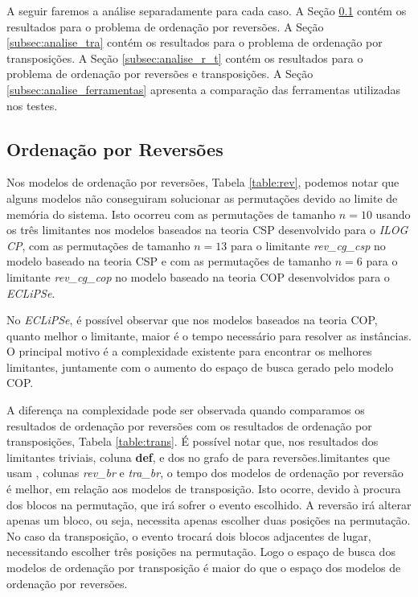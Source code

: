 A seguir faremos a análise separadamente para cada caso. A
Seção \ref{subsec:analise_rev} contém os resultados para o problema de
ordenação por reversões. A Seção \ref{subsec:analise_tra} contém os
resultados para o problema de ordenação por transposições. A
Seção \ref{subsec:analise_r_t} contém os resultados para o problema de
ordenação por reversões e transposições. A
Seção \ref{subsec:analise_ferramentas} apresenta a comparação das
ferramentas utilizadas nos testes.

\subsection{Ordenação por Reversões}
\label{subsec:analise_rev}
Nos modelos de ordenação por reversões, Tabela \ref{table:rev},
podemos notar que alguns modelos não conseguiram solucionar as
permutações devido ao limite de memória do sistema. Isto ocorreu com
as permutações de tamanho $n = 10$ usando os três limitantes nos
modelos baseados na teoria CSP desenvolvido para o \textit{ILOG CP},
com as permutações de tamanho $n = 13$ para o
limitante \textit{rev\_cg\_csp} no modelo baseado na teoria CSP e com
as permutações de tamanho $n = 6$ para o
limitante \textit{rev\_cg\_cop} no modelo baseado na teoria COP
desenvolvidos para o \textit{ECLiPSe}.

No \textit{ECLiPSe}, é possível observar que nos modelos baseados na
teoria COP, quanto melhor o limitante, maior é o tempo necessário para
resolver as instâncias. O principal motivo é a complexidade existente
para encontrar os melhores limitantes, juntamente com o aumento do
espaço de busca gerado pelo modelo COP. 

A diferença na complexidade pode ser observada quando comparamos os
resultados de ordenação por reversões com os resultados de ordenação
por transposições, Tabela \ref{table:trans}. É possível notar que, nos
resultados dos limitantes triviais, coluna \textbf{def}, e dos no
grafo de \bkp{} para reversões.limitantes que usam \bkp{},
colunas \textit{rev\_br} e \textit{tra\_br}, o tempo dos modelos de
ordenação por reversão é melhor, em relação aos modelos de
transposição. Isto ocorre, devido à procura dos blocos na permutação,
que irá sofrer o evento escolhido. A reversão irá alterar apenas um
bloco, ou seja, necessita apenas escolher duas posições na
permutação. No caso da transposição, o evento trocará dois blocos
adjacentes de lugar, necessitando escolher três posições na
permutação. Logo o espaço de busca dos modelos de ordenação por
transposição é maior do que o espaço dos modelos de ordenação por
reversões.

